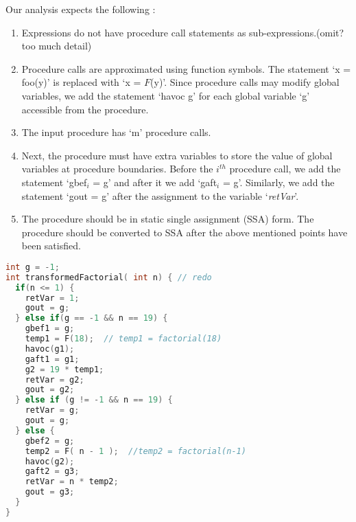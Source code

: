 \documentclass{llncs}
\newcommand{\retVar}{\textit{retVar}}
\newcommand{\F}{\mathit{F}}
\begin{document}
Our analysis expects the following :
\begin{enumerate}
\item Expressions do not have procedure call statements as
  sub-expressions.(omit? too much detail)
\item Procedure calls are approximated using function symbols. The
  statement `x = foo(y)' is replaced with `x = $\F$(y)'. Since
  procedure calls may modify global variables, we add the statement
  `havoc g' for each global variable `g' accessible from the
  procedure.
\item The input procedure has `m' procedure calls.
\item Next, the procedure must have extra variables to store the value
  of global variables at procedure boundaries. Before the
  $\mathit{i^{th}}$ procedure call, we add the statement `gbef$_i$ =
  g' and after it we add `gaft$_i$ = g'. Similarly, we add the
  statement `gout = g' after the assignment to the variable `\retVar'.
\item The procedure should be in static single assignment (SSA)
  form. The procedure should be converted to SSA after the above
  mentioned points have been satisfied.
\end{enumerate}

\begin{lstlisting}[language=c, caption= {Procedure factorial from
      Listing~\ref{lst:factorialSimple} converted to the form our
      approach expects. We refer to this procedure as `transformed
      factorial'.}, label=lst:factorialTransformed]
int g = -1;
int transformedFactorial( int n) { // redo
  if(n <= 1) {
    retVar = 1;
    gout = g;
  } else if(g == -1 && n == 19) {
    gbef1 = g;
    temp1 = F(18);  // temp1 = factorial(18)
    havoc(g1);
    gaft1 = g1;
    g2 = 19 * temp1;
    retVar = g2;
    gout = g2;
  } else if (g != -1 && n == 19) {
    retVar = g;
    gout = g;
  } else {
    gbef2 = g;
    temp2 = F( n - 1 );  //temp2 = factorial(n-1)
    havoc(g2);
    gaft2 = g3;
    retVar = n * temp2;
    gout = g3;
  }
}
\end{lstlisting}

\end{document}
